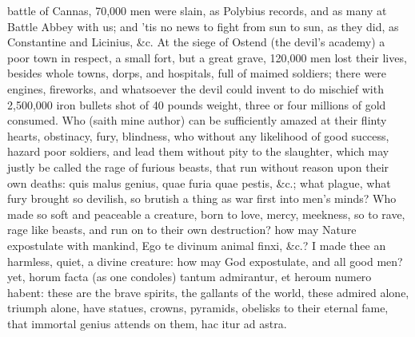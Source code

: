 {battle of Cannas, 70,000 men were slain, as Polybius records, and
as many at Battle Abbey with us; and 'tis no news to fight from sun to
sun, as they did, as Constantine and Licinius, \&c. At the siege of
Ostend (the devil's academy) a poor town in respect, a small fort, but
a great grave, 120,000 men lost their lives, besides whole towns,
dorps, and hospitals, full of maimed soldiers; there were engines,
fireworks, and whatsoever the devil could invent to do mischief with
2,500,000 iron bullets shot of 40 pounds weight, three or four millions
of gold consumed. Who (saith mine author) can be sufficiently
amazed at their flinty hearts, obstinacy, fury, blindness, who without
any likelihood of good success, hazard poor soldiers, and lead them
without pity to the slaughter, which may justly be called the rage of
furious beasts, that run without reason upon their own deaths:
quis malus genius, quae furia quae pestis, \&c.; what plague, what
fury brought so devilish, so brutish a thing as war first into men's
minds? Who made so soft and peaceable a creature, born to love, mercy,
meekness, so to rave, rage like beasts, and run on to their own
destruction? how may Nature expostulate with mankind, Ego te divinum
animal finxi, \&c.? I made thee an harmless, quiet, a divine creature:
how may God expostulate, and all good men? yet, horum facta (as
one condoles) tantum admirantur, et heroum numero habent: these
are the brave spirits, the gallants of the world, these admired alone,
triumph alone, have statues, crowns, pyramids, obelisks to their
eternal fame, that immortal genius attends on them, hac itur ad astra.

}
